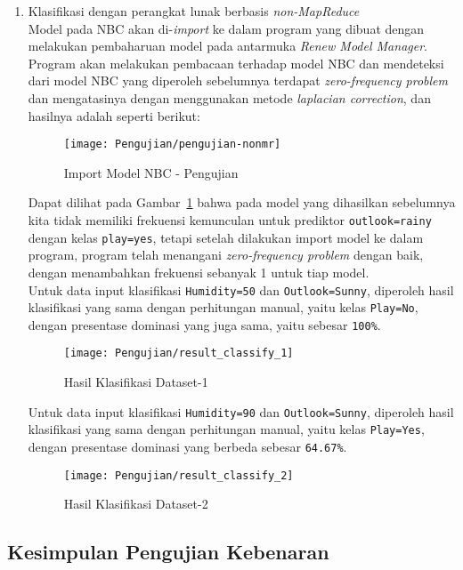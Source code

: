 \begin{enumerate}
	\item{Klasifikasi dengan perangkat lunak berbasis \textit{non-MapReduce}}\\
	Model pada NBC akan di-\textit{import} ke dalam program yang dibuat dengan melakukan pembaharuan model pada antarmuka \textit{Renew Model Manager}. Program akan melakukan pembacaan terhadap model NBC dan mendeteksi dari model NBC yang diperoleh sebelumnya terdapat \textit{zero-frequency problem} dan mengatasinya dengan menggunakan metode \textit{laplacian correction}, dan hasilnya adalah seperti berikut:
	\begin{figure}[H]
	\centering
	\texttt{[image: Pengujian/pengujian-nonmr]}
	\caption[Import Model NBC - Pengujian]{Import Model NBC - Pengujian}
	\label{fig:Import Model NBC - Pengujian}
	\end{figure}
Dapat dilihat pada Gambar~\ref{fig:Import Model NBC - Pengujian} bahwa pada model yang dihasilkan sebelumnya kita tidak memiliki frekuensi kemunculan untuk prediktor \texttt{outlook=rainy} dengan kelas \texttt{play=yes}, tetapi setelah dilakukan import model ke dalam program, program telah menangani \textit{zero-frequency problem} dengan baik, dengan menambahkan frekuensi sebanyak 1 untuk tiap model.\\

Untuk data input klasifikasi \texttt{Humidity=50} dan \texttt{Outlook=Sunny}, diperoleh hasil klasifikasi yang sama dengan perhitungan manual, yaitu kelas \texttt{Play=No}, dengan presentase dominasi yang juga sama, yaitu sebesar \texttt{100\%}.
\begin{figure}[H]
	\centering
	\texttt{[image: Pengujian/result\_classify\_1]}
	\caption[Hasil Klasifikasi Dataset-1]{Hasil Klasifikasi Dataset-1}
	\label{fig:Hasil Klasifikasi Dataset-1}
\end{figure}

Untuk data input klasifikasi \texttt{Humidity=90} dan \texttt{Outlook=Sunny}, diperoleh hasil klasifikasi yang sama dengan perhitungan manual, yaitu kelas \texttt{Play=Yes}, dengan presentase dominasi yang berbeda sebesar \texttt{64.67\%}.
\begin{figure}[H]
	\centering
	\texttt{[image: Pengujian/result\_classify\_2]}
	\caption[Hasil Klasifikasi Dataset-1]{Hasil Klasifikasi Dataset-2}
	\label{fig:Hasil Klasifikasi Dataset-2}
\end{figure}
	
\end{enumerate}

\subsection{Kesimpulan Pengujian Kebenaran}

